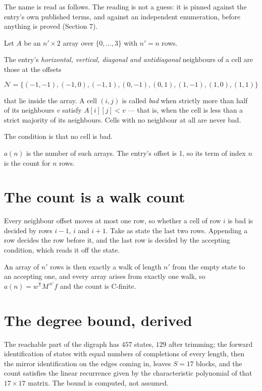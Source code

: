 \documentclass[11pt]{article}
\theoremstyle{definition}
\begin{document}
The name is read as follows. The reading is not a guess: it is pinned against the entry's own published terms, and against an independent enumeration, before anything is proved (Section 7).

Let $A$ be an $n' \times 2$ array over $\{0,\dots,3\}$ with $n' = n$ rows.

The entry's {\itshape horizontal, vertical, diagonal and antidiagonal} neighbours of a cell are those at the offsets

\[\mathcal{N} = \{(-1,-1), (-1,0), (-1,1), (0,-1), (0,1), (1,-1), (1,0), (1,1)\}\]

that lie inside the array. A cell $(i,j)$ is called {\itshape bad} when strictly more than half of its neighbours $v$ satisfy $A[i][j] < v$ --- that is, when the cell is less than a strict majority of its neighbours. Cells with no neighbour at all are never bad.

The condition is that no cell is bad.

$a(n)$ is the number of such arrays. The entry's offset is 1, so its term of index $n$ is the count for $n$ rows.

\section{The count is a walk count}

Every neighbour offset moves at most one row, so whether a cell of row $i$ is bad is decided by rows $i-1$, $i$ and $i+1$. Take as state the last two rows. Appending a row decides the row before it, and the last row is decided by the accepting condition, which reads it off the state.

An array of $n'$ rows is then exactly a walk of length $n'$ from the empty state to an accepting one, and every array arises from exactly one walk, so $a(n) = w^{\mathsf T}M^{\,n'}f$ and the count is C-finite.

\section{The degree bound, derived}

The reachable part of the digraph has $457$ states, $129$ after trimming; the forward identification of states with equal numbers of completions of every length, then the mirror identification on the edges coming in, leaves $S = 17$ blocks, and the count satisfies the linear recurrence given by the characteristic polynomial of that $17\times17$ matrix. The bound is computed, not assumed.
\end{document}
